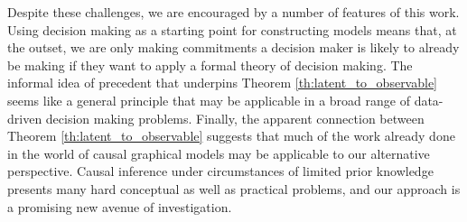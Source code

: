Despite these challenges, we are encouraged by a number of features of this work. Using decision making as a starting point for constructing models means that, at the outset, we are only making commitments a decision maker is likely to already be making if they want to apply a formal theory of decision making. The informal idea of precedent that underpins Theorem \ref{th:latent_to_observable} seems like a general principle that may be applicable in a broad range of data-driven decision making problems. Finally, the apparent connection between Theorem \ref{th:latent_to_observable} suggests that much of the work already done in the world of causal graphical models may be applicable to our alternative perspective. Causal inference under circumstances of limited prior knowledge presents many hard conceptual as well as practical problems, and our approach is a promising new avenue of investigation.

